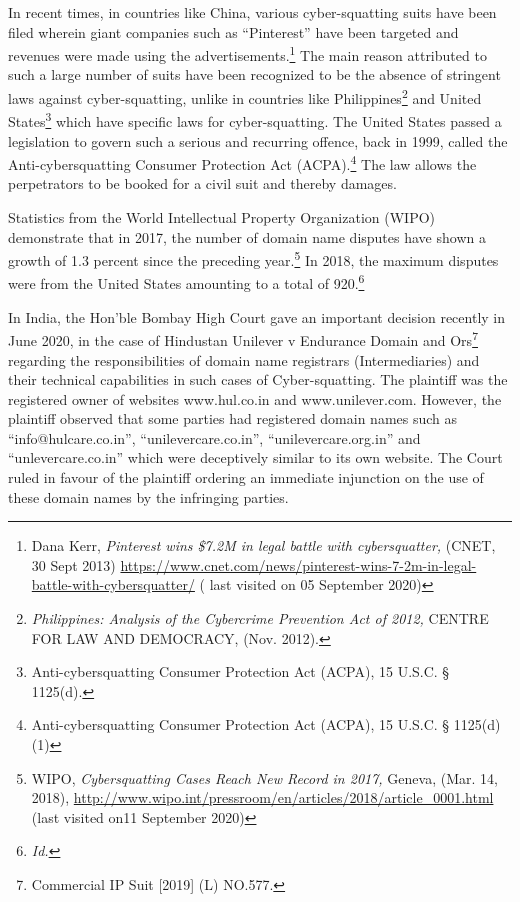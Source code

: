 \begin{multicols}{2}
\noi
In recent times, in countries like China, various cyber-squatting suits have been filed wherein
giant companies such as “Pinterest” have been targeted and revenues were made using the
advertisements.\footnote{Dana Kerr, \textit{Pinterest wins \$7.2M in legal battle with cybersquatter,} (CNET, 30 Sept 2013) \url{https://www.cnet.com/news/pinterest-wins-7-2m-in-legal-battle-with-cybersquatter/} ( last visited on 05 September 2020)} The main reason attributed to such a large number of suits have been
recognized to be the absence of stringent laws against cyber-squatting, unlike in countries
like Philippines\footnote{\textit{Philippines: Analysis of the Cybercrime Prevention Act of 2012,} CENTRE FOR LAW AND DEMOCRACY, (Nov. 2012).} and United States\footnote{Anti-cybersquatting Consumer Protection Act (ACPA), 15 U.S.C. § 1125(d).} which have specific laws for cyber-squatting. The
United States passed a legislation to govern such a serious and recurring offence, back in
1999, called the Anti-cybersquatting Consumer Protection Act (ACPA).\footnote{Anti-cybersquatting Consumer Protection Act (ACPA), 15 U.S.C. § 1125(d) (1)} The law allows the
perpetrators to be booked for a civil suit and thereby damages.

\noi
Statistics from the World Intellectual Property Organization (WIPO) demonstrate that in
2017, the number of domain name disputes have shown a growth of 1.3 percent since the
preceding year.\footnote{WIPO, \textit{Cybersquatting Cases Reach New Record in 2017,} Geneva, (Mar. 14, 2018), \url{http://www.wipo.int/pressroom/en/articles/2018/article_0001.html} (last visited on11 September 2020)} In 2018, the maximum disputes were from the United States amounting to a
total of 920.\footnote{\textit{Id.}}

\noi
In India, the Hon’ble Bombay High Court gave an important decision recently in June 2020,
in the case of Hindustan Unilever v Endurance Domain and Ors\footnote{Commercial IP Suit [2019] (L) NO.577.} regarding the responsibilities of domain name registrars (Intermediaries) and their technical capabilities in
such cases of Cyber-squatting. The plaintiff was the registered owner of websites
www.hul.co.in and www.unilever.com. However, the plaintiff observed that some parties had
registered domain names such as “info@hulcare.co.in”, “unilevercare.co.in”,
“unilevercare.org.in” and “unlevercare.co.in” which were deceptively similar to its own
website. The Court ruled in favour of the plaintiff ordering an immediate injunction on the
use of these domain names by the infringing parties.


\end{multicols}
